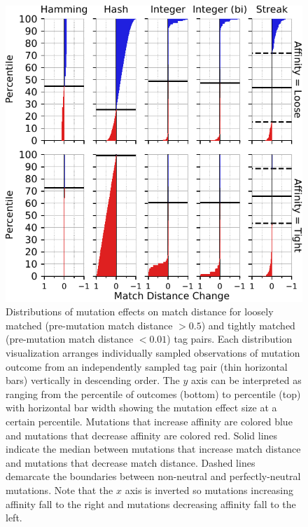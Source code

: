\begin{figure}[!htbp]
\begin{center}

\includegraphics[width=\columnwidth]{img/mutational_step/bitweight=0dot5+seed=1+title=low-mutational-step+_data_hathash_hash=95a57768de56995a+_script_fullcat_hash=b9a24f3843e31e82+ext=}
\caption{
Distributions of mutation effects on match distance for loosely matched (pre-mutation match distance $> 0.5$) and tightly matched (pre-mutation match distance $< 0.01$) tag pairs.
Each distribution visualization arranges individually sampled observations of mutation outcome from an independently sampled tag pair (thin horizontal bars) vertically in descending order.
The $y$ axis can be interpreted as ranging from the  percentile of outcomes (bottom) to  percentile (top) with horizontal bar width showing the mutation effect size at a certain percentile.
Mutations that increase affinity are colored blue and mutations that decrease affinity are colored red.
Solid lines indicate the median between mutations that increase match distance and mutations that decrease match distance.
Dashed lines demarcate the boundaries between non-neutral and perfectly-neutral mutations.
Note that the $x$ axis is inverted so mutations increasing affinity fall to the right and mutations decreasing affinity fall to the left.
}
\label{fig:mutational_step_supp}

\end{center}
\end{figure}
